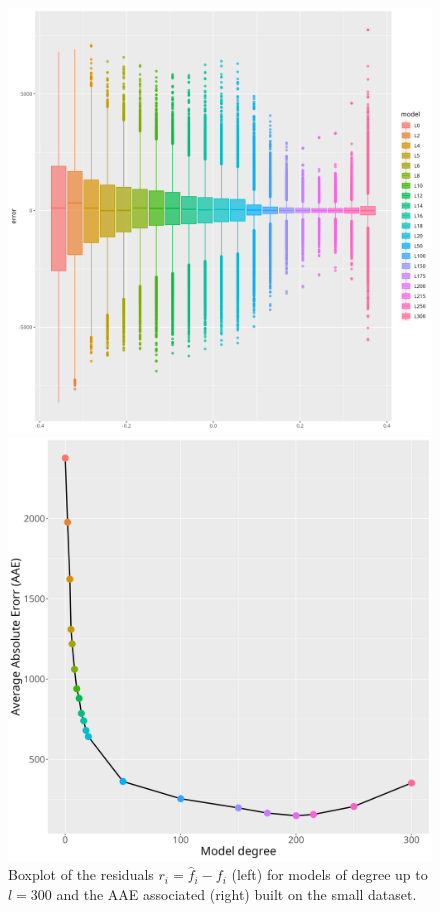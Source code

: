 \documentclass[a4paper]{article}
\theoremstyle{definition}
\begin{document}
\newpage

\begin{figure}[h!]
\begin{minipage}{.45\textwidth}
    \centering
        \includegraphics[width=0.9\linewidth]{media/small_error_box.png}
\end{minipage}
\begin{minipage}{.45\textwidth}
    \centering
        \includegraphics[width=0.9\linewidth]{media/small_err.png}
\end{minipage}
\caption{Boxplot of the residuals $r_i = \hat f_i - f_i$ (left) for models of degree up to $l = 300$ and the AAE associated (right)
built on the small dataset.}
\end{figure}
\end{document}
